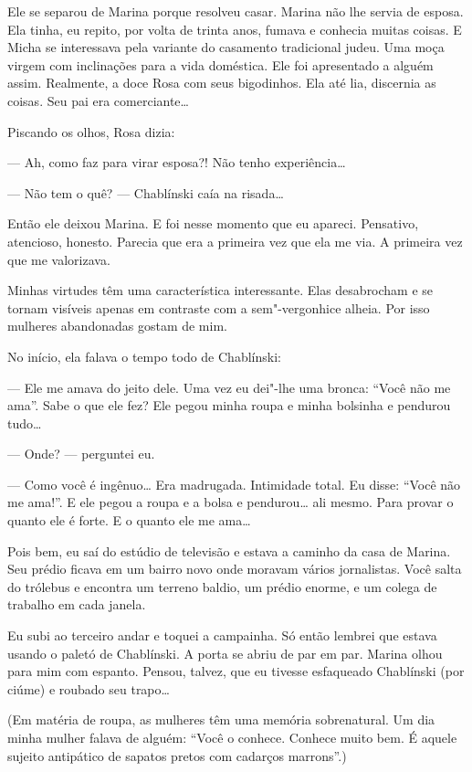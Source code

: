 Ele se separou de Marina porque resolveu casar. Marina não lhe servia de
esposa. Ela tinha, eu repito, por volta de trinta anos, fumava e
conhecia muitas coisas. E Micha se interessava pela variante do
casamento tradicional judeu. Uma moça virgem com inclinações para a vida
doméstica. Ele foi apresentado a alguém assim. Realmente, a doce Rosa
com seus bigodinhos. Ela até lia, discernia as coisas. Seu pai era
comerciante\ldots{}

Piscando os olhos, Rosa dizia:

--- Ah, como faz para virar esposa?! Não tenho experiência\ldots{}

--- Não tem o quê? --- Chablínski caía na risada\ldots{}

Então ele deixou Marina. E foi nesse momento que eu apareci. Pensativo,
atencioso, honesto. Parecia que era a primeira vez que ela me via. A
primeira vez que me valorizava.

Minhas virtudes têm uma característica interessante. Elas desabrocham e
se tornam visíveis apenas em contraste com a sem"-vergonhice alheia. Por
isso mulheres abandonadas gostam de mim.

No início, ela falava o tempo todo de Chablínski:

--- Ele me amava do jeito dele. Uma vez eu dei"-lhe uma bronca: ``Você
não me ama''. Sabe o que ele fez? Ele pegou minha roupa e minha bolsinha
e pendurou tudo\ldots{}

--- Onde? --- perguntei eu.

--- Como você é ingênuo\ldots{} Era madrugada. Intimidade total. Eu disse:
``Você não me ama!''. E ele pegou a roupa e a bolsa e pendurou\ldots{} ali
mesmo. Para provar o quanto ele é forte. E o quanto ele me ama\ldots{}

Pois bem, eu saí do estúdio de televisão e estava a caminho da casa de
Marina. Seu prédio ficava em um bairro novo onde moravam vários
jornalistas. Você salta do trólebus e encontra um terreno baldio, um
prédio enorme, e um colega de trabalho em cada janela.

Eu subi ao terceiro andar e toquei a campainha. Só então lembrei que
estava usando o paletó de Chablínski. A porta se abriu de par em par.
Marina olhou para mim com espanto. Pensou, talvez, que eu tivesse
esfaqueado Chablínski (por ciúme) e roubado seu trapo\ldots{}

(Em matéria de roupa, as mulheres têm uma memória sobrenatural. Um dia
minha mulher falava de alguém: ``Você o conhece. Conhece muito bem. É
aquele sujeito antipático de sapatos pretos com cadarços marrons''.)

